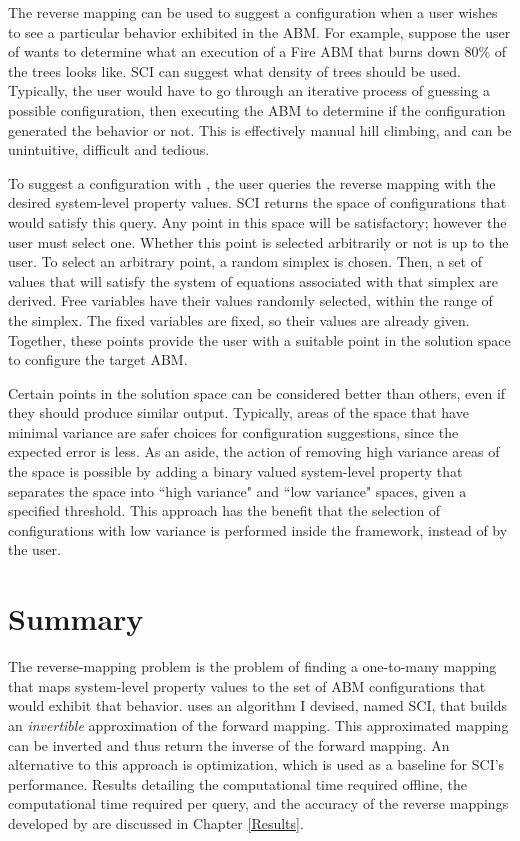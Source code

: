 The reverse mapping can be used to suggest a configuration when a user wishes to see a particular behavior exhibited in the ABM.
For example, suppose the user of \fw wants to determine what an execution of a Fire ABM that burns down 80\% of the trees looks like.
SCI can suggest what density of trees should be used.
Typically, the user would have to go through an iterative process of guessing a possible configuration, then executing the ABM to determine if the configuration generated the behavior or not.
This is effectively manual hill climbing, and can be unintuitive, difficult and tedious.

To suggest a configuration with \fw, the user queries the reverse mapping with the desired system-level property values.
SCI returns the space of configurations that would satisfy this query.
Any point in this space will be satisfactory; however the user must select one.
Whether this point is selected arbitrarily or not is up to the user.
To select an arbitrary point, a random simplex is chosen.
Then, a set of values that will satisfy the system of equations associated with that simplex are derived.
Free variables have their values randomly selected, within the range of the simplex.
The fixed variables are fixed, so their values are already given.
Together, these points provide the user with a suitable point in the solution space to configure the target ABM.

Certain points in the solution space can be considered better than others, even if they should produce similar output.
Typically, areas of the space that have minimal variance are safer choices for configuration suggestions, since the expected error is less.
As an aside, the action of removing high variance areas of the space is possible by adding a binary valued system-level property that separates the space into ``high variance" and ``low variance" spaces, given a specified threshold.
This approach has the benefit that the selection of configurations with low variance is performed inside the framework, instead of by the user.


\section{Summary}
The reverse-mapping problem is the problem of finding a one-to-many mapping that maps system-level property values to the set of ABM configurations that would exhibit that behavior.
\fw uses an algorithm I devised, named SCI, that builds an \textit{invertible} approximation of the forward mapping.
This approximated mapping can be inverted and thus return the inverse of the forward mapping.
An alternative to this approach is optimization, which is used as a baseline for SCI's performance.
Results detailing the computational time required offline, the computational time required per query, and the accuracy of the reverse mappings developed by \fw are discussed in Chapter \ref{Results}.
